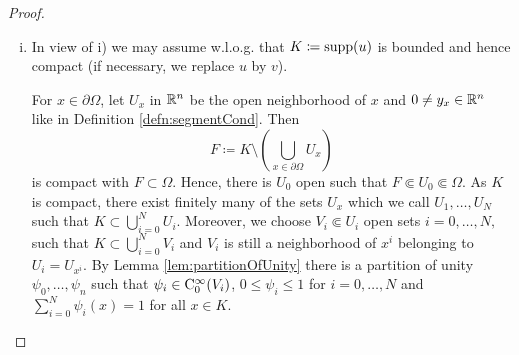 \begin{proof}
\begin{enumerate}[i)]
    \item In view of i) we may assume w.l.o.g. that $K \coloneqq \operatorname{supp}(u)$ is bounded and hence compact (if necessary, we replace $u$ by $v$).

      For $x \in \partial\Omega$, let $U_x$ in $\mathbb{R}^n$ be the open neighborhood of $x$ and $0 \neq y_x \in \mathbb{R}^n$ like in Definition \ref{defn:segmentCond}.
      Then
      $$
      F \coloneqq K \setminus ( \bigcup_{x \in \partial\Omega} U_x )
      $$
      is compact with $F \subset \Omega$.
      Hence, there is $U_0$ open such that $F \Subset U_0 \Subset \Omega$.
      As $K$ is compact, there exist finitely many of the sets $U_x$ which we call $U_1,\dots,U_N$ such that $K \subset \bigcup_{i = 0}^N U_i$.
      Moreover, we choose $V_i \Subset U_i$ open sets $i = 0,\dots,N,$ such that $K \subset \bigcup_{i = 0}^N V_i$ and $V_i$ is still a neighborhood of $x^i$ belonging to $U_i = U_{x^i}$.
      By Lemma \ref{lem:partitionOfUnity} there is a partition of unity $\psi_0,\dots,\psi_n$ such that $\psi_i \in \mathrm{C}_0^\infty(V_i)$, $0\leq \psi_i \leq 1$ for $i = 0,\dots,N$ and $\sum_{i = 0}^N \psi_i(x) = 1$ for all $x \in K$.


\end{enumerate}
\end{proof}
